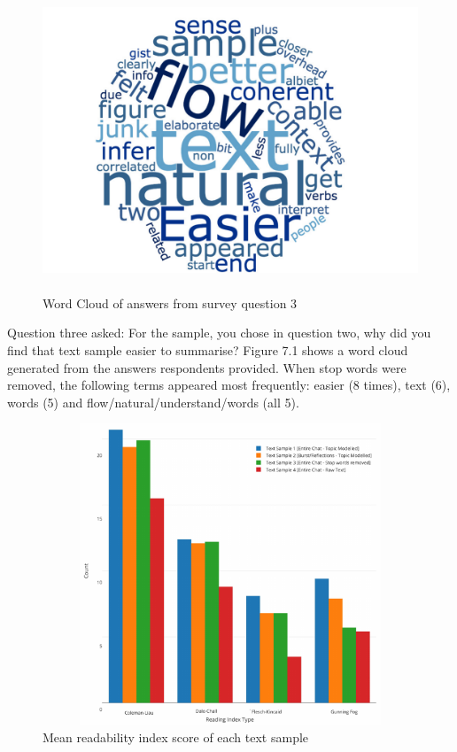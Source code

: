 \begin{figure}
\begin{center}
\includegraphics[height=9cm, width=14cm]{graphs/bundles/wordcloud_v2.pdf} 
\caption{Word Cloud of answers from survey question 3}
\end{center}
\label{fig:chapt7_study1_fig1}
\end{figure}

Question three asked: For the sample, you chose in question two, why did you find that text sample easier to summarise? Figure 7.1 shows a word cloud generated from the answers respondents provided. When stop words were removed, the following terms appeared most frequently: easier (8 times), text (6), words (5) and flow/natural/understand/words (all 5).

\begin{figure}
\begin{center}
\includegraphics[height=9cm, width=14cm]{graphs/bundles/readindex1.pdf} 
\caption{Mean readability index score of each text sample}
\end{center}
\label{fig:chapt7_study1_fig2}
\end{figure}

